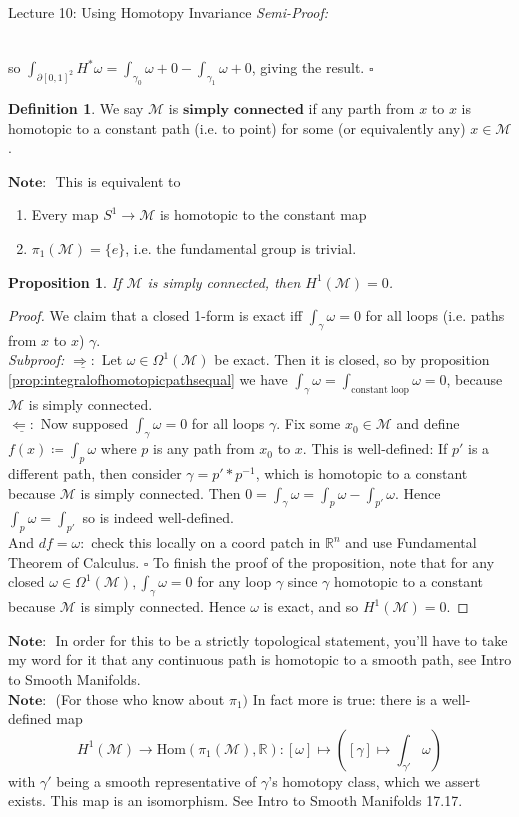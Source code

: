 \documentclass[10pt]{article}
\theoremstyle{plain}
\newtheorem{prop}[thm]{Proposition}
\theoremstyle{definition}
\newtheorem{defn}[thm]{Definition} %
\newenvironment{semiproof}{\textit{Semi-Proof:}}{\hfill$\square$}
\newenvironment{subproof}{\textit{Subproof:}}{\hfill$\square$}
\newcommand{\Note}{\textbf{Note: }}
\newcommand{\Real}{\mathbb{R}}
\newcommand{\man}{\mathcal{M}}
\newcommand{\xman}{x\in\man}
\newcommand{\Hom}[2]{\text{Hom}\left(#1,#2\right)}
\newcommand{\pformman}[1]{\Omega^{#1}(\man)}
\newcommand{\df}{df}
\newcommand{\cohomman}[1]{H^{#1}(\man)}
\newcommand{\inter}{\left[0,1\right]}
\newcommand{\impliesdirection}{\underline{\Rightarrow:}}
\newcommand{\impliedbydirection}{\underline{\Leftarrow:}}
\begin{document}
\begin{section}{Lecture 10: Using Homotopy Invariance}
\begin{semiproof}
$$\begin{tikzcd}
\end{tikzcd}$$ so $\int_{\partial\inter^2} H^*\omega = \int_{\gamma_0}\omega + 0 - \int_{\gamma_1} \omega +0$, giving the result.
\end{semiproof}
\begin{defn}
We say $\man$ is $\textbf{simply connected}$ if any parth from $x$ to $x$ is homotopic to a constant path (i.e. to point) for some (or equivalently any) $\xman$.
\end{defn}
$\Note$ This is equivalent to \begin{enumerate}
    \item Every map $S^1 \to \man$ is homotopic to the constant map
    \item $\pi_1(\man) = \{e\}$, i.e. the fundamental group is trivial.
\end{enumerate}
\begin{prop}
If $\man$ is simply connected, then $\cohomman{1} = 0$.
\end{prop}
\begin{proof}
We claim that a closed 1-form is exact iff $\int_\gamma \omega = 0$ for all loops (i.e. paths from $x$ to $x$) $\gamma$.\\
    \begin{subproof}
    $\impliesdirection$ Let $\omega \in \pformman{1}$ be exact. Then it is closed, so by proposition \ref{prop:integralofhomotopicpathsequal} we have $\int_\gamma \omega =  \int_{\text{constant loop}}\omega = 0$, because $\man $ is simply connected.\\
    $\impliedbydirection$ Now supposed $\int_\gamma \omega =0$ for all loops $\gamma$. Fix some $x_0\in \man$ and define $f(x) \coloneqq \int_p \omega$ where $p$ is any path from $x_0$ to $x$. This is well-defined: If $p'$ is a different path, then consider $\gamma = p' * p^{-1}$, which is homotopic to a constant because $\man$ is simply connected. Then $ 0 = \int_\gamma \omega = \int_p \omega - \int_{p'} \omega.$ Hence $\int_p \omega = \int_{p'}$ so is indeed well-defined.\\
    And $\df = \omega :$ check this locally on a coord patch in $\Real^n$ and use Fundamental Theorem of Calculus.
    \end{subproof}
    To finish the proof of the proposition, note that for any closed $\omega\in\pformman{1}, \int_\gamma \omega = 0$ for any loop $\gamma$ since $\gamma$ homotopic to a constant because $\man$ is simply connected. Hence $\omega$ is exact, and so $\cohomman{1} = 0$.
\end{proof}\noindent
$\Note$ In order for this to be a strictly topological statement, you'll have to take my word for it that any continuous path is homotopic to a smooth path, see Intro to Smooth Manifolds.\\
$\Note$ (For those who know about $\pi_1)$ In fact more is true: there is a well-defined map $$\cohomman{1} \to \Hom{\pi_1(\man)}{\Real} : [\omega] \mapsto \left( [\gamma] \mapsto \int_{\gamma'} \omega\right)$$with $\gamma'$ being a smooth representative of $\gamma$'s homotopy class, which we assert exists. This map is an isomorphism. See Intro to Smooth Manifolds 17.17.
\end{section}
\end{document}
